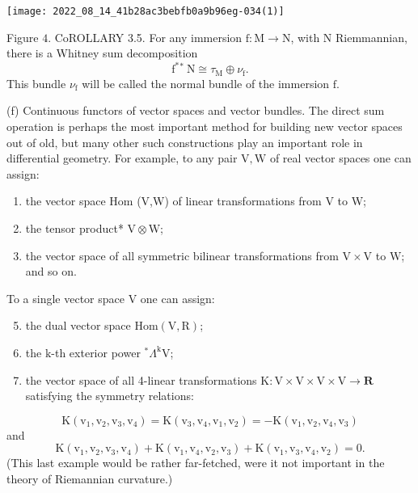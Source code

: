 \documentclass[10pt]{article}
\begin{document}
\texttt{[image: 2022\_08\_14\_41b28ac3bebfb0a9b96eg-034(1)]}

Figure $4 .$ CoROLLARY 3.5. For any immersion $\mathrm{f}: \mathrm{M} \rightarrow \mathrm{N}$, with $\mathrm{N}$ Riemmannian, there is a Whitney sum decomposition
$$
\mathrm{f}^{*}{ }^{*} \mathrm{~N} \cong \tau_{\mathrm{M}} \oplus \nu_{\mathrm{f}} .
$$
This bundle $\nu_{\mathrm{f}}$ will be called the normal bundle of the immersion $\mathrm{f}$.

(f) Continuous functors of vector spaces and vector bundles. The direct sum operation is perhaps the most important method for building new vector spaces out of old, but many other such constructions play an important role in differential geometry. For example, to any pair $\mathrm{V}, \mathrm{W}$ of real vector spaces one can assign:

\begin{enumerate}
  \item the vector space Hom (V,W) of linear transformations from $\mathrm{V}$ to W;

  \item the tensor product* $\mathrm{V} \otimes \mathrm{W}$;

  \item the vector space of all symmetric bilinear transformations from $\mathrm{V} \times \mathrm{V}$ to $\mathrm{W}$; and so on.

\end{enumerate}
To a single vector space $\mathrm{V}$ one can assign:

\begin{enumerate}
  \setcounter{enumi}{4}
  \item the dual vector space $\mathrm{Hom}(\mathrm{V}, \mathrm{R})$;

  \item the $\mathrm{k}$-th exterior power ${ }^{*} \Lambda^{\mathrm{k}} \mathrm{V}$;

  \item the vector space of all 4-linear transformations $\mathrm{K}: \mathrm{V} \times \mathrm{V} \times \mathrm{V} \times \mathrm{V} \rightarrow \mathbf{R}$ satisfying the symmetry relations:

\end{enumerate}
$$
\mathrm{K}\left(\mathrm{v}_{1}, \mathrm{v}_{2}, \mathrm{v}_{3}, \mathrm{v}_{4}\right)=\mathrm{K}\left(\mathrm{v}_{3}, \mathrm{v}_{4}, \mathrm{v}_{1}, \mathrm{v}_{2}\right)=-\mathrm{K}\left(\mathrm{v}_{1}, \mathrm{v}_{2}, \mathrm{v}_{4}, \mathrm{v}_{3}\right)
$$
and
$$
\mathrm{K}\left(\mathrm{v}_{1}, \mathrm{v}_{2}, \mathrm{v}_{3}, \mathrm{v}_{4}\right)+\mathrm{K}\left(\mathrm{v}_{1}, \mathrm{v}_{4}, \mathrm{v}_{2}, \mathrm{v}_{3}\right)+\mathrm{K}\left(\mathrm{v}_{1}, \mathrm{v}_{3}, \mathrm{v}_{4}, \mathrm{v}_{2}\right)=0 .
$$
(This last example would be rather far-fetched, were it not important in the theory of Riemannian curvature.)
\end{document}
